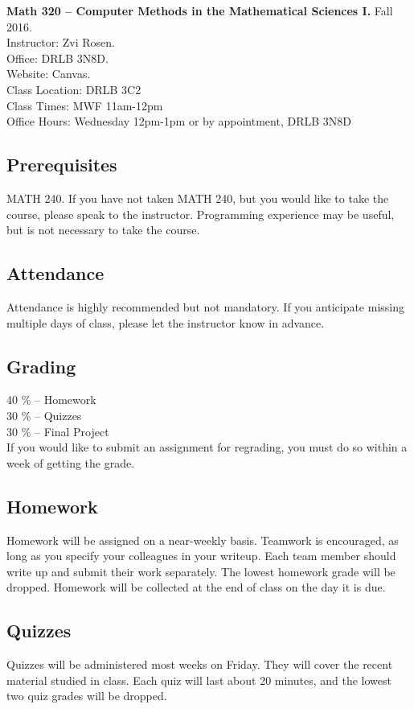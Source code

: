 \documentclass[12pt]{amsart}
\begin{document}
{\bf Math 320 -- Computer Methods in the Mathematical Sciences I.} Fall 2016.\\[3mm]
Instructor: Zvi Rosen. \\
Office: DRLB 3N8D.\\
Website: Canvas.\\ %
Class Location: DRLB 3C2 \\
Class Times: MWF 11am-12pm \\
Office Hours: Wednesday 12pm-1pm or by appointment, DRLB 3N8D

\subsection*{Prerequisites} MATH 240. If you have not taken MATH 240,
but you would like to take the course,
please speak to the instructor. Programming experience may be useful, but
is not necessary to take the course.

\subsection*{Attendance}
Attendance is highly recommended but not mandatory. If you anticipate
missing multiple days of class, please let the instructor know in
advance.

\subsection*{Grading}
40 \% -- Homework \\
30 \% -- Quizzes \\
30 \% -- Final Project \\
If you would like to submit an assignment for regrading, you must
do so within a week of getting the grade.

\subsection*{Homework}
Homework will be assigned on a near-weekly basis. Teamwork is
encouraged, as long as you specify your colleagues in your writeup.
Each team member should write up and submit their work separately.
The lowest homework grade will be dropped. Homework will be
collected at the end of class on the day it is due.

\subsection*{Quizzes}
Quizzes will be administered most weeks on Friday. They will
cover the recent material studied in class.  Each quiz
will last about 20 minutes, and the lowest two quiz grades will be dropped.
\end{document}
